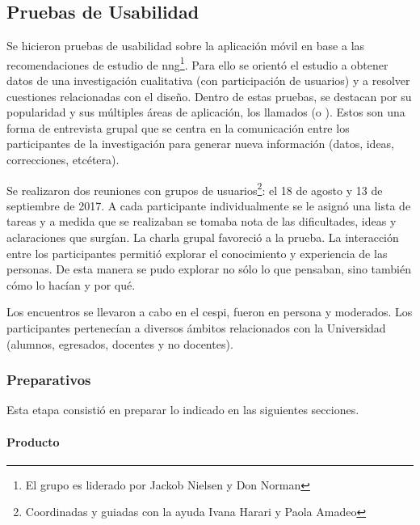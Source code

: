 \subsection{Pruebas de Usabilidad}
\label{desarrollo_pruebas_usabilidad}

Se hicieron pruebas de usabilidad sobre la aplicación móvil en base a las recomendaciones de estudio de \gls{nng}\cite{nng2017usabilityTest}\footnote{El grupo es liderado por Jackob Nielsen y Don Norman}. Para ello se orientó el estudio a obtener datos de una investigación cualitativa (con participación de usuarios) y a resolver cuestiones relacionadas con el diseño. 
Dentro de estas pruebas, se destacan por su popularidad y sus múltiples
áreas de aplicación, los llamados  (o ).
Estos son una forma de entrevista grupal que se centra en la comunicación entre los participantes de la investigación para generar nueva información (datos, ideas, correcciones, etcétera)\cite{kitzinger1995qualitative}.

Se realizaron dos reuniones con grupos de usuarios\footnote{Coordinadas y guiadas con la ayuda Ivana Harari y Paola Amadeo}: el 18 de agosto y 13 de septiembre de 2017. A cada participante individualmente se le asignó una lista de tareas y a medida que se realizaban se tomaba nota de las dificultades, ideas y aclaraciones que surgían. La charla grupal favoreció a la prueba. La interacción entre los participantes permitió explorar el conocimiento y experiencia de las personas. De esta manera se pudo explorar no sólo lo que pensaban, sino también cómo lo hacían y por qué.

Los encuentros se llevaron a cabo en el \gls{cespi}, fueron en persona y moderados. Los participantes pertenecían a diversos ámbitos relacionados con la Universidad (alumnos, egresados, docentes y no docentes).

\subsubsection{Preparativos}
\label{desarrollo_pruebas_usabilidad_preparativos}

Esta etapa consistió en preparar lo indicado en las siguientes secciones.

\paragraph{Producto}
\label{desarrollo_pruebas_usabilidad_preparativos_producto}

